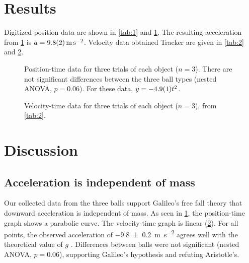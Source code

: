 \documentclass[reprint,amsmath,amssymb,aps,twoside]{revtex4-2}
\begin{document}
\section{Results}
Digitized position data are shown in \cref{tab:1} and \cref{fig:trackery}. The resulting acceleration from \cref{fig:trackery} is $a=\qty{9.8\pm0.2}{\meter\per\second\squared}$. Velocity data obtained Tracker are given in \cref{tab:2} and \cref{fig:trackervy}. 



\begin{figure}
\begin{center}

\end{center}
\caption{Position-time data for three trials of each object ($n=3$). There are not significant differences between the three ball types (nested ANOVA, $p=0.06$). For these data, $y=-\num{4.9\pm0.1}t^2$.}
\label{fig:trackery}
\end{figure}



\begin{figure}
\begin{center}

\end{center}
\caption{Velocity-time data for three trials of each object ($n=3$), from \cref{tab:2}.}
\label{fig:trackervy}
\end{figure}




\section{Discussion}
\subsection{Acceleration is independent of mass}
Our collected data from the three balls support Galileo’s free fall theory that downward
acceleration is independent of mass. As seen in \cref{fig:trackery}, the position-time graph shows a parabolic curve.  The velocity-time graph is linear (\cref{fig:trackervy}). For all points, the observed acceleration of \qty{-9.8\pm0.2}{\meter\per\second\squared} agrees well with the theoretical value of $g$ \cite{tipler,openstax,barrons}. Differences between balls were not significant (nested ANOVA, $p=0.06$), supporting Galileo's hypothesis and refuting Aristotle's. 
\end{document}
